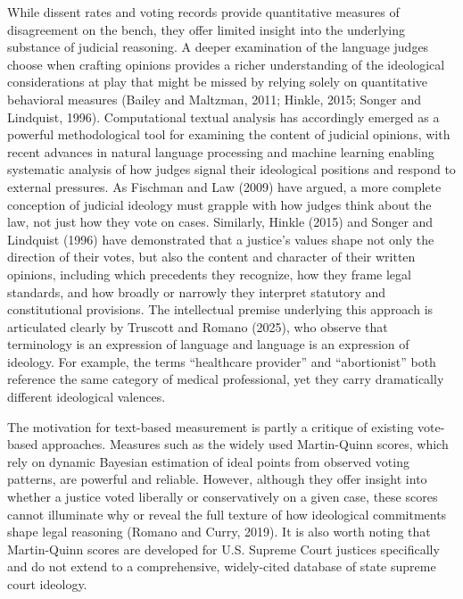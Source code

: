 While dissent rates and voting records provide quantitative measures of
disagreement on the bench, they offer limited insight into the
underlying substance of judicial reasoning. A deeper examination of the
language judges choose when crafting opinions provides a richer
understanding of the ideological considerations at play that might be
missed by relying solely on quantitative behavioral measures (Bailey and
Maltzman, 2011; Hinkle, 2015; Songer and Lindquist, 1996). Computational
textual analysis has accordingly emerged as a powerful methodological
tool for examining the content of judicial opinions, with recent
advances in natural language processing and machine learning enabling
systematic analysis of how judges signal their ideological positions and
respond to external pressures. As Fischman and Law (2009) have argued, a
more complete conception of judicial ideology must grapple with how
judges think about the law, not just how they vote on cases. Similarly,
Hinkle (2015) and Songer and Lindquist (1996) have demonstrated that a
justice's values shape not only the direction of their votes, but also
the content and character of their written opinions, including which
precedents they recognize, how they frame legal standards, and how
broadly or narrowly they interpret statutory and constitutional
provisions. The intellectual premise underlying this approach is
articulated clearly by Truscott and Romano (2025), who observe that
terminology is an expression of language and language is an expression
of ideology. For example, the terms ``healthcare provider'' and
``abortionist'' both reference the same category of medical
professional, yet they carry dramatically different ideological
valences.

The motivation for text-based measurement is partly a critique of
existing vote-based approaches. Measures such as the widely used
Martin-Quinn scores, which rely on dynamic Bayesian estimation of ideal
points from observed voting patterns, are powerful and reliable.
However, although they offer insight into whether a justice voted
liberally or conservatively on a given case, these scores cannot
illuminate why or reveal the full texture of how ideological commitments
shape legal reasoning (Romano and Curry, 2019). It is also worth noting
that Martin-Quinn scores are developed for U.S. Supreme Court justices
specifically and do not extend to a comprehensive, widely-cited database
of state supreme court ideology.

